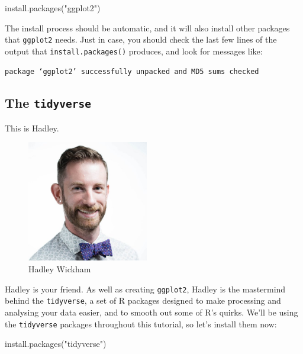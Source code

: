 \documentclass[
]{book}
\newenvironment{Shaded}{\begin{snugshade}}{\end{snugshade}}
\newcommand{\FunctionTok}[1]{\textcolor[rgb]{0.00,0.00,0.00}{#1}}
\newcommand{\NormalTok}[1]{#1}
\newcommand{\StringTok}[1]{\textcolor[rgb]{0.31,0.60,0.02}{#1}}
\begin{document}
\begin{Shaded}
\begin{Highlighting}[]
\FunctionTok{install.packages}\NormalTok{(}\StringTok{"ggplot2"}\NormalTok{)}
\end{Highlighting}
\end{Shaded}

The install process should be automatic, and it will also install
other packages that \texttt{ggplot2} needs. Just in case, you should check
the last few lines of the output that \texttt{install.packages()} produces,
and look for messages like:

\begin{verbatim}
package ‘ggplot2’ successfully unpacked and MD5 sums checked
\end{verbatim}

\hypertarget{the-tidyverse}{%
\subsection{\texorpdfstring{The \texttt{tidyverse}}{The tidyverse}}\label{the-tidyverse}}

This is Hadley.

\begin{figure}
\centering
\includegraphics[width=\textwidth,height=2.08333in]{Images/Hadley.jpg}
\caption{Hadley Wickham}
\end{figure}

Hadley is your friend. As well as creating \texttt{ggplot2}, Hadley is the mastermind
behind the \texttt{tidyverse}, a set of R packages designed to make processing
and analysing your data easier, and to smooth out some of R's quirks.
We'll be using the \texttt{tidyverse} packages throughout this tutorial, so let's
install them now:

\begin{Shaded}
\begin{Highlighting}[]
\FunctionTok{install.packages}\NormalTok{(}\StringTok{"tidyverse"}\NormalTok{)}
\end{Highlighting}
\end{Shaded}
\end{document}
